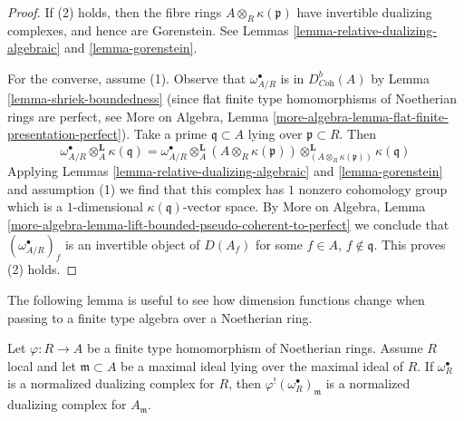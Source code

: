 \begin{proof}
If (2) holds, then the fibre rings $A \otimes_R \kappa(\mathfrak p)$
have invertible dualizing complexes, and hence are Gorenstein.
See Lemmas \ref{lemma-relative-dualizing-algebraic} and \ref{lemma-gorenstein}.

\medskip\noindent
For the converse, assume (1).
Observe that $\omega_{A/R}^\bullet$ is in $D^b_{\textit{Coh}}(A)$
by Lemma \ref{lemma-shriek-boundedness} (since flat finite type homomorphisms
of Noetherian rings are perfect, see 
More on Algebra, Lemma
\ref{more-algebra-lemma-flat-finite-presentation-perfect}).
Take a prime $\mathfrak q \subset A$ lying over $\mathfrak p \subset R$.
Then
$$
\omega_{A/R}^\bullet \otimes_A^\mathbf{L} \kappa(\mathfrak q) =
\omega_{A/R}^\bullet \otimes_A^\mathbf{L}
(A \otimes_R \kappa(\mathfrak p))
\otimes_{(A \otimes_R \kappa(\mathfrak p))}^\mathbf{L}
\kappa(\mathfrak q)
$$
Applying Lemmas \ref{lemma-relative-dualizing-algebraic} and
\ref{lemma-gorenstein} and assumption (1) we find that this complex has $1$
nonzero cohomology group which is a $1$-dimensional
$\kappa(\mathfrak q)$-vector space. By
More on Algebra, Lemma
\ref{more-algebra-lemma-lift-bounded-pseudo-coherent-to-perfect}
we conclude that $(\omega_{A/R}^\bullet)_f$ is an invertible
object of $D(A_f)$ for some $f \in A$, $f \not \in \mathfrak q$.
This proves (2) holds.
\end{proof}

\noindent
The following lemma is useful to see how dimension functions change
when passing to a finite type algebra over a Noetherian ring.

\begin{lemma}
\label{lemma-shriek-normalized}
Let $\varphi : R \to A$ be a finite type homomorphism of Noetherian rings.
Assume $R$ local and let $\mathfrak m \subset A$ be a maximal
ideal lying over the maximal ideal of $R$. If $\omega_R^\bullet$
is a normalized dualizing complex for $R$, then
$\varphi^!(\omega_R^\bullet)_\mathfrak m$ is a normalized
dualizing complex for $A_\mathfrak m$.
\end{lemma}

